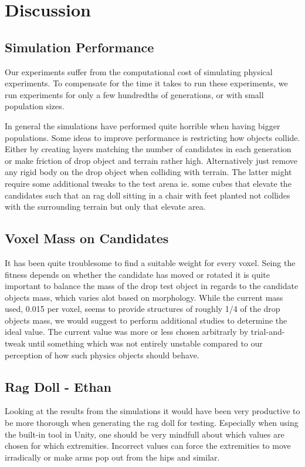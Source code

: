 \section{Discussion}
\subsection{Simulation Performance}
Our experiments suffer from the computational cost of simulating physical
experiments. To compensate for the time it takes to run these experiments, we
run experiments for only a few hundredths of generations, or with small
population sizes. 

In general the
simulations have performed quite horrible when having bigger populations. Some
ideas to improve performance is restricting how objects collide. Either by
creating layers matching the number of candidates in each generation or make
friction of drop object and terrain rather high. Alternatively just remove any
rigid body on the drop object when colliding with terrain. The latter might
require some additional tweaks to the test arena ie. some cubes that elevate
the candidates such that an rag doll sitting in a chair with feet planted not
collides with the surrounding terrain but only that elevate area.

\subsection{Voxel Mass on Candidates} It has been quite troublesome to find a
suitable weight for every voxel. Seing the fitness depends on whether the
candidate has moved or rotated it is quite important to balance the mass of the
drop test object in regards to the candidate objects mass, which varies alot
based on morphology. While the current mass used, 0.015 per voxel, seems to
provide structures of roughly 1/4 of the drop objects mass, we would suggest to
perform additional studies to determine the ideal value. The current value was
more or less chosen arbitrarly by trial-and-tweak until something which was not
entirely unstable compared to our perception of how such physics objects should
behave.

\subsection{Rag Doll - Ethan} Looking at the results from the simulations it
would have been very productive to be more thorough when generating the rag
doll for testing. Especially when using the built-in tool in Unity, one should
be very mindfull about which values are chosen for which extremities. Incorrect
values can force the extremities to move irradically or make arms pop out from
the hips and similar.
